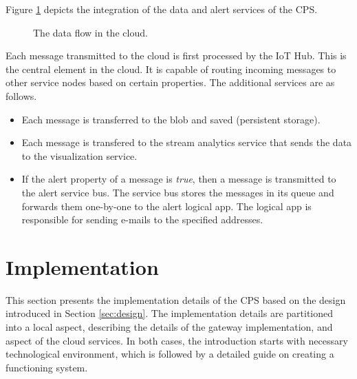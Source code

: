 \documentclass[a4paper, 11pt]{article}
\begin{document}
	Figure \ref{fig:cloud} depicts the integration of the data and alert services of the CPS.
		
	\begin{figure}[h!]
		\center
		\caption{The data flow in the cloud.}
		\label{fig:cloud}
	\end{figure}
	
	Each message transmitted to the cloud is first processed by the IoT Hub. This is the central element in the cloud. It is 		capable of routing incoming messages to other service nodes based on certain properties. The additional services are as follows.
	 \begin{itemize}
	 	\item Each message is transferred to the blob and saved (persistent storage).
		\item Each message is transfered to the stream analytics service that sends the data to the visualization service.
	 	\item If the alert property of a message is \textsl{true}, then a message is transmitted to the alert service bus. The service bus stores the messages in its queue and forwards them one-by-one to the alert logical app. The logical app is responsible for sending e-mails to the specified addresses.
	 \end{itemize}
	
	\section{Implementation}
	\label{sec:implementation}
	This section presents the implementation details of the CPS based on the design introduced in Section \ref{sec:design}. The implementation details are partitioned into a local aspect, describing the details of the gateway implementation, and aspect of the cloud services. In both cases, the introduction starts with necessary technological environment, which is followed by a detailed guide on creating a functioning system.
	
\end{document}
